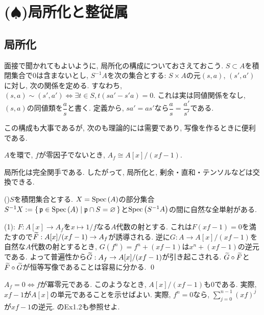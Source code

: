 \section{($\spadesuit$)局所化と整従属}
\subsection{局所化}
面接で聞かれてもよいように, 局所化の構成についておさえておこう. $S\subset A$を積閉集合で0は含まないとし, $S^{-1}A$を次の集合とする: $S\times A$の元$(s,a)$, $(s',a')$に対し, 次の関係を定める. すなわち, $(s,a)\sim (s',a') \iff \exists t\in S, t(sa' - s'a) = 0$. これは実は同値関係をなし, $(s,a)$の同値類を$\dfrac{a}{s}$と書く. 定義から, $sa' = as'$なら$\dfrac{a}{s} = \dfrac{a'}{s'}$である. \par
この構成も大事であるが, 次のも理論的には需要であり, 写像を作るときに便利である.



\begin{prop}
\ben
\item $A$を環で, $f$が零因子でないとき, $A_{f} \cong A[x]/(xf - 1)$.
\item 局所化は完全関手である. したがって, 局所化と, 剰余・直和・テンソルなどは交換できる.
\item ()$S$を積閉集合とする. $X=\mathrm{Spec}\left( A \right)$の部分集合$S^{-1}X:=\set{\mathfrak{p}\in \mathrm{Spec}\left( A \right)\mid \mathfrak{p}\cap S = \varnothing}$と$\mathrm{Spec}\left( S^{-1}A \right)$の間に自然な全単射がある.
\een
\end{prop}
\prf
(1): $F:A[x] \to A_f$を$x\mapsto 1/f$なる$A$代数の射とする. これは$F(xf - 1) = 0$を満たすので$\widetilde{F}:A[x]/(xf-1) \to A_{f}$が誘導される. 逆に$G:A\to A[x]/(xf-1)$を自然な$A$代数の射とするとき, $G(f^n) = f^n + (xf-1)$は$x^n + (xf-1)$の逆元である. よって普遍性から$\widetilde{G}:A_{f} \to A[x]/(xf-1)$が引き起こされる. $\widetilde{G}\circ \widetilde{F}$と$\widetilde{F}\circ \widetilde{G}$が恒等写像であることは容易に分かる.
\qed

\begin{rem}
$A_{f} = 0 \iff f$が冪零元である. このようなとき, $A[x]/(xf-1)$も0である. 実際, $xf - 1$が$A[x]$の単元であることを示せばよい. 実際, $f^n = 0$なら, $\sum_{j=0}^{n-1} (xf)^{j}$が$xf-1$の逆元. \cite{atimac}のEx1.2も参照せよ.
\end{rem}


